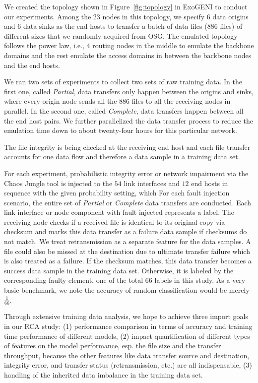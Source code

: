 We created the topology shown in Figure~\ref{fig:topology} in ExoGENI to conduct our experiments. Among the $23$ nodes in this topology, we specify $6$ data origins and $6$ data sinks as the end hosts 
to transfer a batch of data files ($886$ files) of different sizes that we randomly acquired from OSG. The emulated topology follows the power law, i.e., $4$ routing 
nodes in the middle to emulate the backbone domains and the rest emulate the access domains in between the backbone nodes and the end hosts. 

We ran two sets of experiments to collect two sets of raw training data. In the first one, called {\it Partial},
data transfers only happen between the origins and sinks, where every origin node sends all the $886$ files 
to all the receiving nodes in parallel. In the second one, called {\it Complete}, data transfers happen between all the end host pairs. 
We further parallelized the data transfer process to reduce the emulation time down to about twenty-four hours for this particular network.  

The file integrity is being checked at the receiving end host and each file transfer accounts for one data flow and therefore a
 data sample in a training data set.

For each experiment, probabilistic integrity error or network impairment via the Chaos Jungle tool is injected to the $54$ link interfaces and $12$ end hosts in sequence with the given probability setting, which 
For each fault injection scenario, the entire set of {\it Partial} or {\it Complete} data transfers are conducted. Each link interface or node component with fault injected represents a label.  
The receiving node checks if a received file is identical to its original copy via checksum and marks this data transfer as a failure data sample if checksums do not match. 
We treat retransmission as a separate feature for the data samples.  A file could also be missed at the destination due to ultimate transfer failure which is also treated as a failure. 
If the checksum matches, this data transfer becomes a success data sample in the training data set. Otherwise, it is labeled by the corresponding faulty element, one of the total $66$ labels in this study. 
As a very basic benchmark, we note the accuracy of random classification would be merely $\frac{1}{66}$. 

Through extensive training data analysis, we hope to achieve three import goals in our RCA study:  (1) performance comparison in terms of accuracy and training time performance of different models, 
(2) impact quantification of different types of features on the model performance, esp. the file size and the transfer throughput, because the other features like data transfer source and destination, integrity error, 
and transfer status (retransmission, etc.) are all indispensable, (3) handling of the inherited data imbalance in the training data set.  

